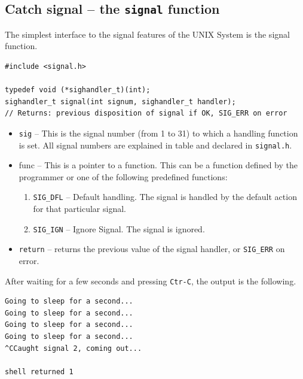 \documentclass[a4paper]{article}
\begin{document}
\subsection{Catch signal -- the \texttt{signal} function}
The simplest interface to the signal features of the UNIX System is the signal function.
\begin{verbatim}
#include <signal.h>

typedef void (*sighandler_t)(int);
sighandler_t signal(int signum, sighandler_t handler);
// Returns: previous disposition of signal if OK, SIG_ERR on error
\end{verbatim}
\begin{itemize}
    \item \texttt{sig} -- This is the signal number (from 1 to 31) to which a handling function is set. All signal numbers are explained in table \TODO and declared in \texttt{signal.h}. 
    \item func -- This is a pointer to a function. This can be a function defined by the programmer or one of the following predefined functions:
    \begin{enumerate}
        \item \texttt{SIG\_DFL} -- Default handling. The signal is handled by the default action for that particular signal.
        \item \texttt{SIG\_IGN} -- Ignore Signal. The signal is ignored.
    \end{enumerate}
    \item \texttt{return} -- returns the previous value of the signal handler, or \texttt{SIG\_ERR} on error.
\end{itemize}

After waiting for a few seconds and pressing \texttt{Ctr-C}, the output is the following.
\begin{verbatim}
Going to sleep for a second...
Going to sleep for a second...
Going to sleep for a second...
Going to sleep for a second...
^CCaught signal 2, coming out...

shell returned 1
\end{verbatim}
\end{document}

